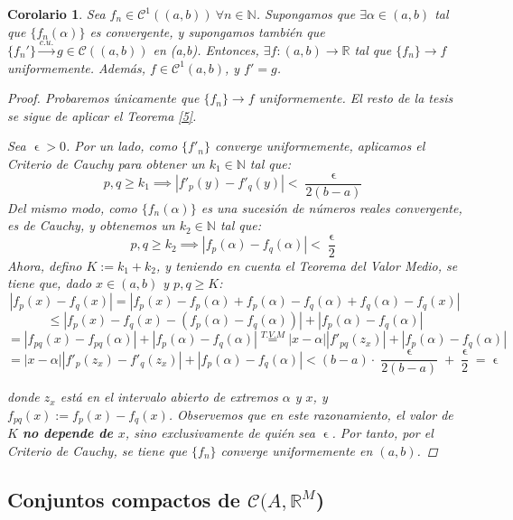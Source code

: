 \documentclass[11pt, a4paper]{article}
\let\epsilon\upvarepsilon
\newcommand{\fn}{\{f_n\}}
\theoremstyle{theorem-style}
\newtheorem{ncor}{Corolario}[section]
\theoremstyle{definition-style}
\theoremstyle{remark-style}
\theoremstyle{example-style}
\begin{document}
\begin{ncor}
	Sea $f_n\in \mathcal{C}^1((a,b)) \ \forall n \in \mathbb{N}$. Supongamos que $\exists \alpha \in (a,b)$ tal que $ \{f_n(\alpha)\}$ es convergente, y supongamos también que $\{f_n'\} \xrightarrow{c.u.} g \in \mathcal C((a,b))$ en (a,b). Entonces, $\exists f: (a,b) \to \mathbb{R}$ tal que $\fn \to f$ uniformemente. Además, $f \in \mathcal{C}^1(a,b)$, y  $f' = g$.

\begin{proof}
	Probaremos únicamente que $\fn \to f$ uniformemente. El resto de la tesis se sigue de aplicar el \textit{Teorema \ref{5}}.
	
Sea $\epsilon > 0$. Por un lado, como $\{f'_n\}$ converge uniformemente, aplicamos el \textit{Criterio de Cauchy} para obtener un $k_1 \in \mathbb{N}$ tal que: $$p,q \ge k_1 \implies |f'_p(y) - f'_q(y)| < \frac{\epsilon}{2 (b-a)}$$
Del mismo modo, como $\{f_n(\alpha)\}$ es una sucesión de números reales convergente, es de Cauchy, y obtenemos un $k_2 \in \mathbb{N}$ tal que: $$p,q \ge k_2 \implies |f_p(\alpha) - f_q(\alpha)| < \frac{\epsilon}{2}$$
Ahora, defino $K := k_1 + k_2$, y teniendo en cuenta el \textit{Teorema del Valor Medio}, se tiene que, dado $x \in (a,b)$ y $p,q \ge K$: $$|f_p(x) - f_q(x)| = |f_p(x) - f_p(\alpha) + f_p(\alpha) - f_q(\alpha) + f_q(\alpha) - f_q(x)|$$ $$\le |f_p(x) - f_q(x) - (f_p(\alpha) - f_q(\alpha))| + |f_p(\alpha) - f_q(\alpha)| $$ $$= |f_{pq}(x) - f_{pq}(\alpha)| + |f_p(\alpha) - f_q(\alpha)| \overset{T.V.M}{=} |x-\alpha||f'_{pq}(z_x)| + |f_p(\alpha) - f_q(\alpha)|$$ $$= \left|x-\alpha \right|\left| f'_p(z_x) - f'_q(z_x) \right| + |f_p(\alpha) - f_q(\alpha)| < (b-a) \cdot \frac{\epsilon}{2(b-a)} + \frac{\epsilon}{2} = \epsilon$$

donde $z_x$ está en el intervalo abierto de extremos $\alpha$ y $x$, y $f_{pq}(x) := f_p(x) - f_q(x)$. Observemos que en este razonamiento, el valor de $K$ \textbf{no depende de $x$}, sino exclusivamente de quién sea $\epsilon$. Por tanto, por el \textit{Criterio de Cauchy}, se tiene que $\{f_n\}$ converge uniformemente en $(a,b)$.
\end{proof}
	
\end{ncor}



\subsection{Conjuntos compactos de $\mathcal{C}(A, \mathbb{R}^M$)}
\end{document}
